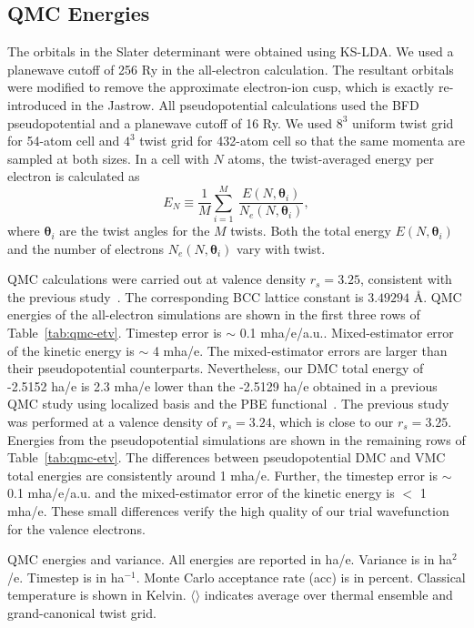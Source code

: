 \documentclass[aps,prl,superscriptaddress]{revtex4-1}
\newcommand{\bs}{\boldsymbol}
\begin{document}
\subsection{QMC Energies}

The orbitals in the Slater determinant were obtained using KS-LDA. We used a planewave cutoff of 256 Ry in the all-electron calculation. The resultant orbitals were modified to remove the approximate electron-ion cusp, which is exactly re-introduced in the Jastrow. All pseudopotential calculations used the BFD pseudopotential and a planewave cutoff of 16 Ry. We used $8^3$ uniform twist grid for 54-atom cell and $4^3$ twist grid for 432-atom cell so that the same momenta are sampled at both sizes. In a cell with $N$ atoms, the twist-averaged energy per electron is calculated as
\begin{equation}
E_N \equiv \frac{1}{M}\sum\limits_{i=1}^{M}~\dfrac{E(N, \bs{\theta}_i)}{N_e(N, \bs{\theta}_i)},
\end{equation}
where $\bs{\theta}_i$ are the twist angles for the $M$ twists. Both the total energy $E(N, \bs{\theta}_i)$ and the number of electrons $N_e(N, \bs{\theta}_i)$ vary with twist.

QMC calculations were carried out at valence density $r_s=3.25$, consistent with the previous study~\cite{Filippi1999}.
The corresponding BCC lattice constant is $3.49294$ \AA.
QMC energies of the all-electron simulations are shown in the first three rows of Table~\ref{tab:qmc-etv}. Timestep error is $\sim$ 0.1 mha/e/a.u.. Mixed-estimator error of the kinetic energy is $\sim$ 4 mha/e. The mixed-estimator errors are larger than their pseudopotential counterparts. Nevertheless, our DMC total energy of -2.5152 ha/e is 2.3 mha/e lower than the -2.5129 ha/e obtained in a previous QMC study using localized basis and the PBE functional~\cite{Rasch2015}. The previous study was performed at a valence density of $r_s=3.24$, which is close to our $r_s=3.25$.
Energies from the pseudopotential simulations are shown in the remaining rows of Table~\ref{tab:qmc-etv}. The differences between pseudopotential DMC and VMC total energies are consistently around 1 mha/e. Further, the timestep error is $\sim$ 0.1 mha/e/a.u. and the mixed-estimator error of the kinetic energy is $<$ 1 mha/e. These small differences verify the high quality of our trial wavefunction for the valence electrons.

\begin{table}[h]
\caption{QMC energies and variance. All energies are reported in ha/e. Variance is in ha$^2$/e. Timestep is in ha$^{-1}$. Monte Carlo acceptance rate (acc) is in percent. Classical temperature is shown in Kelvin. $\langle\rangle$ indicates average over thermal ensemble and grand-canonical twist grid.}

\label{tab:qmc-etv}
\end{table}
\end{document}
